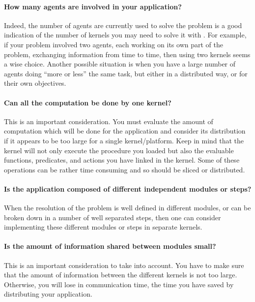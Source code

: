 
\paragraph{How many agents are involved in your application?} Indeed,
the number of agents are currently used to solve the problem is a good
indication of the number of kernels you may need to solve it with
\COPRS{}. For example, if your problem involved two agents, each working on
its own part of the problem, exchanging information from time to time,
then using two kernels seems a wise choice. Another possible situation is
when you have a large number of agents doing ``more or less'' the same
task, but either in a distributed way, or for their own objectives.

\paragraph{Can all the computation be done by one kernel?} This is an
important consideration. You must evaluate the amount of computation which
will be done for the application and consider its distribution if it
appears to be too large for a single kernel/platform. Keep in mind that
the kernel will not only execute the procedure you loaded but also the
evaluable functions, predicates, and actions you have linked in the
kernel. Some of these operations can be rather time consuming and
so should be sliced or distributed.

\paragraph{Is the application composed of different independent modules
or steps?} When the resolution of the problem is well defined in
different modules, or can be broken down in a number of well separated
steps, then one can consider implementing these different modules or
steps in separate kernels.

\paragraph{Is the amount of information shared between modules small?} This is an
important consideration to take into account. You have to make sure that
the amount of information between the different kernels is not too large.
Otherwise, you will lose in communication time, the time you have saved
by distributing your application.

